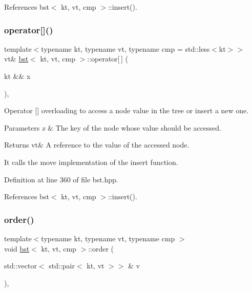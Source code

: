References bst$<$ kt, vt, cmp $>$\+::insert().

\mbox{\label{classbst_a024d828ac753881e50cd7cc93a47a3cc}} 
\subsubsection{\texorpdfstring{operator[]()}{operator[]()}\hspace{0.1cm}{\footnotesize\ttfamily [2/2]}}
{\footnotesize\ttfamily template$<$typename kt, typename vt, typename cmp = std\+::less$<$kt$>$$>$ \\
vt\& \hyperlink{classbst}{bst}$<$ kt, vt, cmp $>$\+::operator\mbox{[}$\,$\mbox{]} (\begin{DoxyParamCaption}\item[{kt \&\&}]{x }\end{DoxyParamCaption})\hspace{0.3cm}{\ttfamily [inline]}, {\ttfamily [noexcept]}}



Operator \mbox{[}\mbox{]} overloading to access a node value in the tree or insert a new one. 


\begin{DoxyParams}{Parameters}
{\em x} & The key of the node whose value should be accessed. \\
\hline
\end{DoxyParams}
\begin{DoxyReturn}{Returns}
vt\& A reference to the value of the accessed node.
\end{DoxyReturn}
It calls the move implementation of the insert function. 

Definition at line 360 of file bst.\+hpp.



References bst$<$ kt, vt, cmp $>$\+::insert().

\mbox{\label{classbst_a0dfe021194e7c01cefe01fabad7fc976}} 
\subsubsection{\texorpdfstring{order()}{order()}}
{\footnotesize\ttfamily template$<$typename kt, typename vt, typename cmp $>$ \\
void \hyperlink{classbst}{bst}$<$ kt, vt, cmp $>$\+::order (\begin{DoxyParamCaption}\item[{std\+::vector$<$ std\+::pair$<$ kt, vt $>$$>$ \&}]{v }\end{DoxyParamCaption})\hspace{0.3cm}{\ttfamily [private]}, {\ttfamily [noexcept]}}



